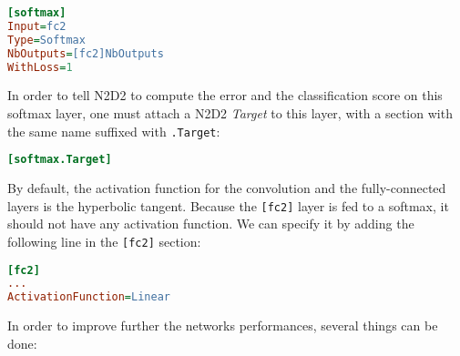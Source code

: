 \documentclass[a4paper,11pt,oneside]{article}
\begin{document}
\begin{lstlisting}[language=ini]
[softmax]
Input=fc2
Type=Softmax
NbOutputs=[fc2]NbOutputs
WithLoss=1
\end{lstlisting}

In order to tell N2D2 to compute the error and the classification score on this
softmax layer, one must attach a N2D2 \emph{Target} to this layer, with a
section with the same name suffixed with \lstinline!.Target!:

\begin{lstlisting}[language=ini]
[softmax.Target]
\end{lstlisting}

By default, the activation function for the convolution and the fully-connected
layers is the hyperbolic tangent. Because the \lstinline![fc2]! layer is fed
to a softmax, it should not have any activation function. We can specify it by
adding the following line in the \lstinline![fc2]! section:

\begin{lstlisting}[language=ini]
[fc2]
...
ActivationFunction=Linear
\end{lstlisting}

In order to improve further the networks performances, several things can be
done:
\end{document}
